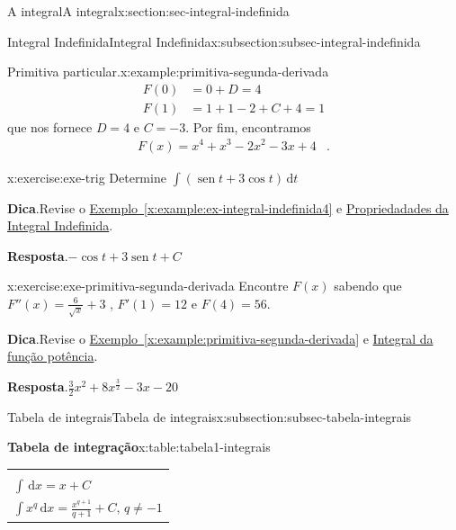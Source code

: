 \documentclass[oneside,10pt,]{article}
\newcommand{\blocktitlefont}{\relax}
\newcommand{\tabularfont}{\relax}
\newcommand{\xreffont}{\relax}
\numberwithin{equation}{section}
\newcommand{\hrulethin}  {\noalign{\hrule height 0.04em}}
\newcommand{\hrulethick} {\noalign{\hrule height 0.11em}}
\newcommand{\dd}{\mathrm{d}}
\newcommand{\integral}[2]{\displaystyle\int {#1}\,\dd {#2}}
\DeclareMathOperator{\sin}{sen}
\newcommand{\amp}{&}
\begin{document}
\begin{sectionptx}{A integral}{}{A integral}{}{}{x:section:sec-integral-indefinida}
\begin{subsectionptx}{Integral Indefinida}{}{Integral Indefinida}{}{}{x:subsection:subsec-integral-indefinida}
\begin{example}{Primitiva particular.}{x:example:primitiva-segunda-derivada}
\begin{align*}
F(0)  \amp = 0+D =4 \\
F(1) \amp = 1+ 1-2+C+4=1 
\end{align*}
que nos fornece \(D=4\) e \(C=-3\). Por fim, encontramos%
\begin{align*}
F(x) = x^4+ x^3-2x^2-3x+4 \amp \text{.}
\end{align*}
%
\end{example}
\begin{inlineexercise}{}{x:exercise:exe-trig}%
Determine \(\integral{\left(\sin{t}+3\cos{t}\right)}{t}\)%
\par\smallskip%
\noindent\textbf{\blocktitlefont Dica}.\hypertarget{g:hint:idp25}{}\quad{}Revise o \hyperref[x:example:ex-integral-indefinida4]{Exemplo~{\xreffont\ref{x:example:ex-integral-indefinida4}}} e \hyperref[x:assemblage:thm-prop-integral-indefinida]{Propriedadades da Integral Indefinida}.%
\par\smallskip%
\noindent\textbf{\blocktitlefont Resposta}.\hypertarget{g:answer:idp26}{}\quad{}\(-\cos{t} + 3\sin{t} + C\)%
\end{inlineexercise}%
\begin{inlineexercise}{}{x:exercise:exe-primitiva-segunda-derivada}%
Encontre \(F(x)\) sabendo que \(F''(x)=\frac{6}{\sqrt{x}} + 3\) , \(F'(1)=12\) e \(F(4)=56\).%
\par\smallskip%
\noindent\textbf{\blocktitlefont Dica}.\hypertarget{g:hint:idp27}{}\quad{}Revise  o \hyperref[x:example:primitiva-segunda-derivada]{Exemplo~{\xreffont\ref{x:example:primitiva-segunda-derivada}}} e \hyperref[x:assemblage:prob-integral-funcao-potencia]{Integral da função potência}.%
\par\smallskip%
\noindent\textbf{\blocktitlefont Resposta}.\hypertarget{g:answer:idp28}{}\quad{}\(\frac{3}{2}x^{2} + 8x^{\frac{3}{2}} - 3x - 20\)%
\end{inlineexercise}%
\end{subsectionptx}
%
%
\typeout{************************************************}
\typeout{************************************************}
%
\begin{subsectionptx}{Tabela de integrais}{}{Tabela de integrais}{}{}{x:subsection:subsec-tabela-integrais}
\begin{tableptx}{\textbf{Tabela de integração}}{x:table:tabela1-integrais}{}%
\centering
{\tabularfont%
\begin{tabular}{l}\hrulethick
\multicolumn{1}{c}{Fórmula}\tabularnewline\hrulethin
\(\integral{}{x}=x+ C\)\tabularnewline[0pt]
\(\integral{x^q}{x}=\frac{x^{q+1}}{q+1} + C,\,q\neq -1\)\tabularnewline[0pt]

\end{tabular}}
\end{tableptx}
\end{subsectionptx}
\end{sectionptx}
\end{document}
